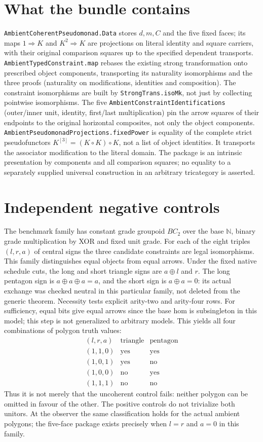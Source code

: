 \documentclass[11pt]{article}
\newcommand{\nm}[1]{\nolinkurl{#1}}
\begin{document}
\section*{What the bundle contains}
\nm{AmbientCoherentPseudomonad.Data} stores $d,m,C$ and the five fixed faces;
its maps $1\Rightarrow K$ and $K^2\Rightarrow K$ are projections on
literal identity and square carriers, with their original comparison squares
up to the specified dependent transports. \nm{AmbientTypedConstraint.map}
rebases the existing strong transformation onto prescribed object
components, transporting its naturality isomorphisms and the three proofs
(naturality on modifications, identities and composition). The constraint
isomorphisms are built by \nm{StrongTrans.isoMk}, not just by collecting
pointwise isomorphisms. The five
\nm{AmbientConstraintIdentifications} (outer/inner unit, identity, first/last
multiplication) pin the arrow squares of their endpoints to the original
horizontal composites, not only the object components.
\nm{AmbientPseudomonadProjections.fixedPower} is equality of the complete
strict pseudofunctors $K^{[3]}=(K\circ K)\circ K$, not a list of object
identities. It transports the associator modification to the literal domain.
The package is an intrinsic presentation by components and all comparison
squares; no equality to a separately supplied universal construction in an
arbitrary tricategory is asserted.

\section*{Independent negative controls}
The benchmark family has constant grade groupoid $BC_2$ over the base
$\mathbb N$, binary grade multiplication by XOR and fixed unit grade. For
each of the eight triples $(l,r,a)$ of central signs the three candidate
constraints are legal isomorphisms. This family distinguishes equal objects
from equal arrows. Under the fixed native schedule cuts, the long and short
triangle signs are $a\oplus l$ and $r$. The long pentagon sign is
$a\oplus a\oplus a=a$, and the short sign is $a\oplus a=0$: its
actual exchange was checked neutral in this particular family, not deleted
from the generic theorem. Necessity tests explicit arity-two and arity-four
rows. For sufficiency, equal bits give equal arrows since the base hom is
subsingleton in this model; this step is not generalized to arbitrary models.
This yields all four combinations of polygon truth values:
\[
\begin{array}{c|cc}
(l,r,a)&\text{triangle}&\text{pentagon}\\ \hline
(1,1,0)&\mathrm{yes}&\mathrm{yes}\\
(1,0,1)&\mathrm{yes}&\mathrm{no}\\
(1,0,0)&\mathrm{no}&\mathrm{yes}\\
(1,1,1)&\mathrm{no}&\mathrm{no}
\end{array}
\]
Thus it is not merely that the uncoherent control fails: neither polygon
can be omitted in favour of the other. The positive controls do not
trivialize both unitors. At the observer the same classification holds for
the actual ambient polygons; the five-face package exists precisely when
$l=r$ and $a=0$ in this family.
\end{document}
